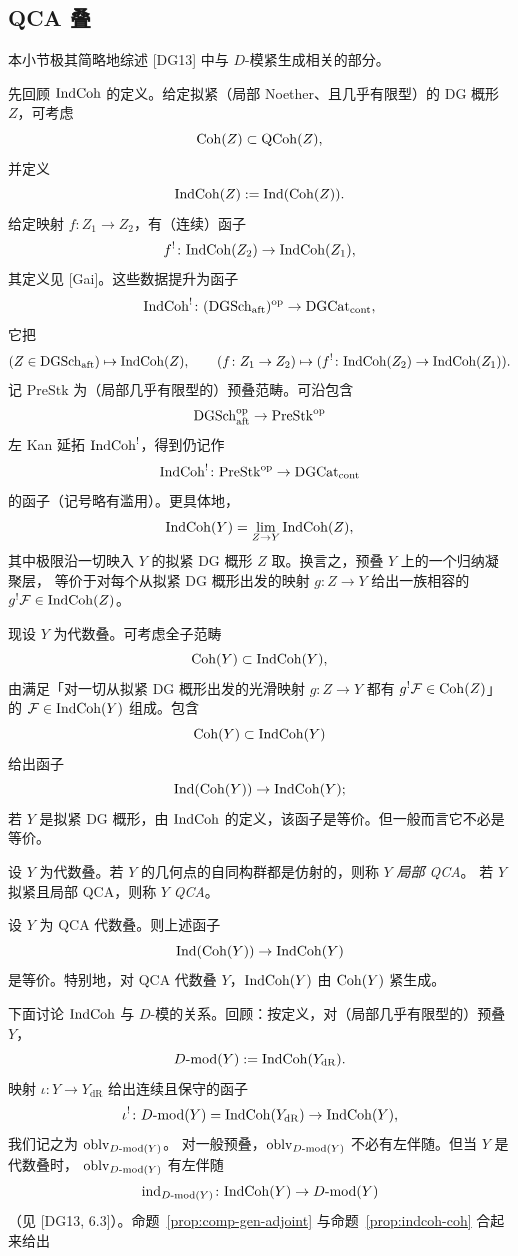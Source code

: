 
\subsection{QCA 叠}
\label{sec:qca}

本小节极其简略地综述 [DG13] 中与 $D$-模紧生成相关的部分。

先回顾 $\mathrm{IndCoh}$ 的定义。给定拟紧（局部 Noether、且几乎有限型）的 DG 概形 $Z$，可考虑
\[
\mathrm{Coh}(Z)\subset \mathrm{QCoh}(Z),
\]
并定义
\[
\mathrm{IndCoh}(Z):=\operatorname{Ind}(\mathrm{Coh}(Z)).
\]
给定映射 $f\colon Z_1\to Z_2$，有（连续）函子
\[
f^{!}\colon \mathrm{IndCoh}(Z_2)\to \mathrm{IndCoh}(Z_1),
\]
其定义见 [Gai]。这些数据提升为函子
\[
\mathrm{IndCoh}^{!}\colon (\mathrm{DGSch}_{\mathrm{aft}})^{\mathrm{op}}\to \mathrm{DGCat}_{\mathrm{cont}},
\]
它把
\[
(Z\in \mathrm{DGSch}_{\mathrm{aft}})\mapsto \mathrm{IndCoh}(Z),\qquad
(f\colon Z_1\to Z_2)\mapsto (f^{!}\colon \mathrm{IndCoh}(Z_2)\to \mathrm{IndCoh}(Z_1)).
\]
记 $\mathrm{PreStk}$ 为（局部几乎有限型的）预叠范畴。可沿包含
\[
\mathrm{DGSch}^{\mathrm{op}}_{\mathrm{aft}}\to \mathrm{PreStk}^{\mathrm{op}}
\]
左 Kan 延拓 $\mathrm{IndCoh}^{!}$，得到仍记作
\[
\mathrm{IndCoh}^{!}\colon \mathrm{PreStk}^{\mathrm{op}}\to \mathrm{DGCat}_{\mathrm{cont}}
\]
的函子（记号略有滥用）。更具体地，
\[
\mathrm{IndCoh}(Y)=\lim_{Z\to Y}\mathrm{IndCoh}(Z),
\]
其中极限沿一切映入 $Y$ 的拟紧 DG 概形 $Z$ 取。换言之，预叠 $Y$ 上的一个归纳凝聚层，
等价于对每个从拟紧 DG 概形出发的映射 $g\colon Z\to Y$ 给出一族相容的
$g^{!}\mathcal{F}\in \mathrm{IndCoh}(Z)$。

现设 $Y$ 为代数叠。可考虑全子范畴
\[
\mathrm{Coh}(Y)\subset \mathrm{IndCoh}(Y),
\]
由满足「对一切从拟紧 DG 概形出发的光滑映射 $g\colon Z\to Y$ 都有
$g^{!}\mathcal{F}\in \mathrm{Coh}(Z)$」的 $\mathcal{F}\in \mathrm{IndCoh}(Y)$ 组成。包含
\[
\mathrm{Coh}(Y)\subset \mathrm{IndCoh}(Y)
\]
给出函子
\[
\operatorname{Ind}(\mathrm{Coh}(Y))\to \mathrm{IndCoh}(Y);
\]
若 $Y$ 是拟紧 DG 概形，由 $\mathrm{IndCoh}$ 的定义，该函子是等价。但一般而言它不必是等价。

\begin{definition}[{[DG15, 定义 2.2.2]}]
\label{def:qca}
设 $Y$ 为代数叠。若 $Y$ 的几何点的自同构群都是仿射的，则称 $Y$ \emph{局部 QCA}。
若 $Y$ 拟紧且局部 QCA，则称 $Y$ \emph{QCA}。
\end{definition}

\begin{proposition}[{[DG13, 定理 3.3.5]}]
\label{prop:indcoh-coh}
设 $Y$ 为 QCA 代数叠。则上述函子
\[
\operatorname{Ind}(\mathrm{Coh}(Y))\to \mathrm{IndCoh}(Y)
\]
是等价。特别地，对 QCA 代数叠 $Y$，$\mathrm{IndCoh}(Y)$ 由 $\mathrm{Coh}(Y)$ 紧生成。
\end{proposition}

下面讨论 $\mathrm{IndCoh}$ 与 $D$-模的关系。回顾：按定义，对（局部几乎有限型的）预叠 $Y$，
\[
D\text{-}\mathrm{mod}(Y):=\mathrm{IndCoh}(Y_{\mathrm{dR}}).
\]
映射 $\iota\colon Y\to Y_{\mathrm{dR}}$ 给出连续且保守的函子
\[
\iota^{!}\colon D\text{-}\mathrm{mod}(Y)=\mathrm{IndCoh}(Y_{\mathrm{dR}})\to \mathrm{IndCoh}(Y),
\]
我们记之为 $\operatorname{oblv}_{D\text{-}\mathrm{mod}(Y)}$。
对一般预叠，$\operatorname{oblv}_{D\text{-}\mathrm{mod}(Y)}$ 不必有左伴随。但当 $Y$ 是代数叠时，
$\operatorname{oblv}_{D\text{-}\mathrm{mod}(Y)}$ 有左伴随
\[
\operatorname{ind}_{D\text{-}\mathrm{mod}(Y)}\colon \mathrm{IndCoh}(Y)\to D\text{-}\mathrm{mod}(Y)
\]
（见 [DG13, 6.3]）。命题~\ref{prop:comp-gen-adjoint} 与命题~\ref{prop:indcoh-coh}
合起来给出

